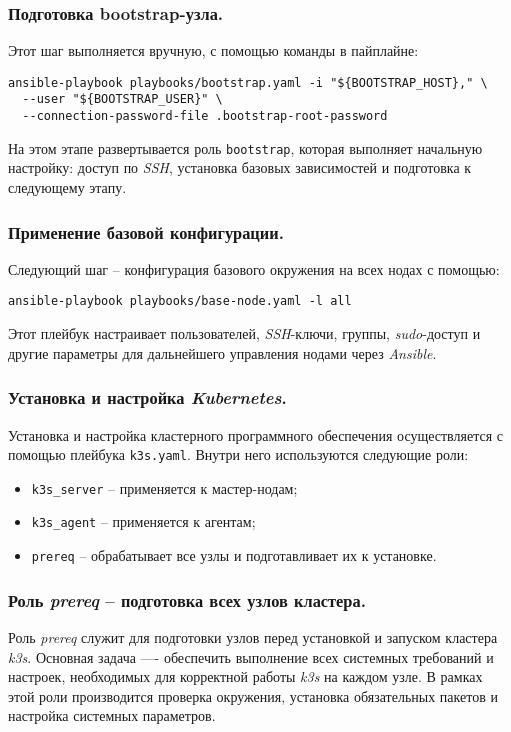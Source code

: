 \subsubsection{Подготовка bootstrap-узла.} Этот шаг выполняется вручную, с помощью команды в пайплайне:

\begin{lstlisting}
ansible-playbook playbooks/bootstrap.yaml -i "${BOOTSTRAP_HOST}," \
  --user "${BOOTSTRAP_USER}" \
  --connection-password-file .bootstrap-root-password
\end{lstlisting}

На этом этапе развертывается роль \lstinline{bootstrap}, которая выполняет начальную настройку: доступ по \textit{SSH}, установка базовых зависимостей и подготовка к следующему этапу.

\subsubsection{Применение базовой конфигурации.} Следующий шаг -- конфигурация базового окружения на всех нодах с помощью:

\begin{lstlisting}
ansible-playbook playbooks/base-node.yaml -l all
\end{lstlisting}

Этот плейбук настраивает пользователей, \textit{SSH}-ключи, группы, \textit{sudo}-доступ и другие параметры для дальнейшего управления нодами через \textit{Ansible}.

\subsubsection{Установка и настройка \textit{Kubernetes}.} Установка и настройка кластерного программного обеспечения\cite{k3s} осуществляется с помощью плейбука \lstinline{k3s.yaml}. Внутри него используются следующие роли:

\begin{itemize}
  \item \lstinline{k3s_server} -- применяется к мастер-нодам;
  \item \lstinline{k3s_agent} -- применяется к агентам;
  \item \lstinline{prereq} -- обрабатывает все узлы и подготавливает их к установке.
\end{itemize}

\subsubsection{Роль \textit{prereq} -- подготовка всех узлов кластера.}
Роль \textit{prereq} служит для подготовки узлов перед установкой и запуском кластера \textit{k3s}. Основная задача —- обеспечить выполнение всех системных требований и настроек, необходимых для корректной работы \textit{k3s} на каждом узле. В рамках этой роли производится проверка окружения, установка обязательных пакетов и настройка системных параметров.

